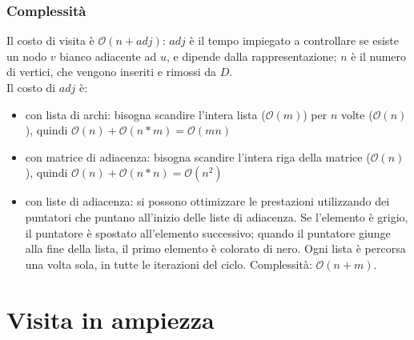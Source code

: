 \documentclass[11pt]{book}
\begin{document}
\subsubsection{Complessità}
Il costo di visita è $\mathcal{O}(n+adj)$: $adj$ è il tempo impiegato a controllare se esiste un nodo $v$ bianco adiacente 
ad $u$, e dipende dalla rappresentazione; $n$ è il numero di vertici, che vengono inseriti e rimossi da $D$.\\
Il costo di $adj$ è:
\begin{itemize}
    \item con lista di archi: bisogna scandire l'intera lista ($\mathcal{O}(m)$) per $n$ volte ($\mathcal{O}(n)$), quindi 
    $\mathcal{O}(n)+\mathcal{O}(n*m)=\mathcal{O}(mn)$
    \item con matrice di adiacenza: bisogna scandire l'intera riga della matrice ($\mathcal{O}(n)$), quindi $\mathcal{O}(n)+\mathcal{O}(n*n)=\mathcal{O}(n^2)$
    \item con liste di adiacenza: si possono ottimizzare le prestazioni utilizzando dei puntatori che puntano all'inizio 
    delle liste di adiacenza. Se l'elemento è grigio, il puntatore è spostato all'elemento successivo; quando il puntatore 
    giunge alla fine della lista, il primo elemento è colorato di nero. Ogni lista è percorsa una volta sola, in tutte le 
    iterazioni del ciclo. Complessità: $\mathcal{O}(n+m)$.
\end{itemize}
\section{Visita in ampiezza}
\end{document}
